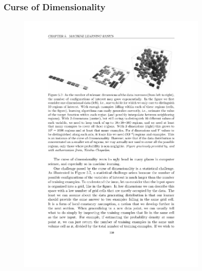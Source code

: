 \documentclass{beamer}
\begin{document}
%

%

\begin{frame}
  \frametitle{Curse of Dimensionality}

  \begin{figure}
    \centering
    \includegraphics[width=0.8\textwidth]{curse_of_dimensionality.pdf}
  \end{figure}
\end{frame}
\end{document}
